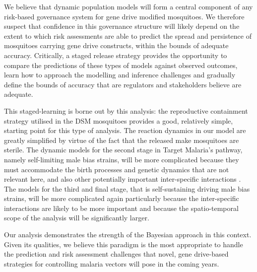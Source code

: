 \documentclass[]{bmcart}
\begin{document}
We believe that dynamic population models will form a central component of any risk-based governance system for gene drive modified mosquitoes. We therefore suspect that confidence in this governance structure will likely depend on the extent to which risk assessments are able to predict the spread and persistence of mosquitoes carrying gene drive constructs, within the bounds of adequate accuracy. Critically, a staged release strategy provides the opportunity to compare the predictions of these types of models against observed outcomes, learn how to approach the modelling and inference challenges and gradually define the bounds of accuracy that are regulators and stakeholders believe are adequate.

This staged-learning is borne out by this analysis: the reproductive containment strategy utilised in the DSM mosquitoes provides a good, relatively simple, starting point for this type of analysis. The reaction dynamics in our model are greatly simplified by virtue of the fact that the released make mosquitoes are sterile. The dynamic models for the second stage in Target Malaria's pathway, namely self-limiting male bias strains, will be more complicated because they must accommodate the birth processes and genetic dynamics that are not relevant here, and also other potentially important inter-specific interactions \citep{Beeton2020}. The models for the third and final stage, that is self-sustaining driving male bias strains, will be more complicated again particularly because the inter-specific interactions are likely to be more important and because the spatio-temporal scope of the analysis will be significantly larger.

Our analysis demonstrates the strength of the Bayesian approach in this context. Given its qualities, we believe this paradigm is the most appropriate to handle the prediction and risk assessment challenges that novel, gene drive-based strategies for controlling malaria vectors will pose in the coming years.

\end{document}
